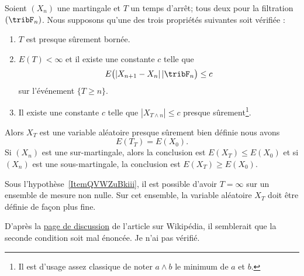 \begin{theorem} \label{ThoZTrdjtZ}
    Soient \( (X_n)\) une martingale et \( T\) un temps d'arrêt; tous deux pour la filtration \( (\tribF_n)\). Nous supposons qu'une des trois propriétés suivantes soit vérifiée :
    \begin{enumerate}
        \item
            \( T\) est presque sûrement bornée.
        \item
            \( E(T)<\infty\) et il existe une constante \( c\) telle que
            \begin{equation}
                E\big( | X_{n+1}-X_n |\,|\tribF_n \big)\leq c
            \end{equation}
            sur l'événement \( \{ T\geq n \}\).
        \item   \label{ItemQVWZuBkiii}
            Il existe une constante \( c\) telle que \( | X_{T\wedge n} |\leq c\) presque sûrement\footnote{Il est d'usage assez classique de noter \( a\wedge b\) le minimum de \( a\) et \( b\).}.
    \end{enumerate}
    Alors \( X_T\) est une variable aléatoire presque sûrement bien définie nous avons
    \begin{equation}
        E(T_T)=E(X_0).
    \end{equation}
    Si \( (X_n)\) est une sur-martingale, alors la conclusion est \( E(X_T)\leq E(X_0)\) et si \( (X_n)\) est une sous-martingale, la conclusion est \( E(X_T)\geq E(X_0)\).
\end{theorem}

\begin{remark}
    Sous l'hypothèse~\ref{ItemQVWZuBkiii}, il est possible d'avoir \( T=\infty\) sur un ensemble de mesure non nulle. Sur cet ensemble, la variable aléatoire \( X_T\) doit être définie de façon plus fine.
\end{remark}

\begin{probleme}
    D'après la \href{https://en.wikipedia.org/wiki/Talk:Optional_stopping_theorem}{page de discussion} de l'article sur Wikipédia, il semblerait que la seconde condition soit mal énoncée. Je n'ai pas vérifié.
\end{probleme}

